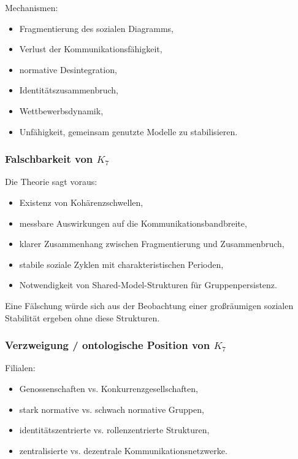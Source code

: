 Mechanismen:
\begin{itemize}
    \item Fragmentierung des sozialen Diagramms,
    \item Verlust der Kommunikationsfähigkeit,
    \item normative Desintegration,
    \item Identitätszusammenbruch,
    \item Wettbewerbsdynamik,
    \item Unfähigkeit, gemeinsam genutzte Modelle zu stabilisieren.
\end{itemize}

\subsubsection{Falschbarkeit von \texorpdfstring{$K_7$}{K_7}}

Die Theorie sagt voraus:
\begin{itemize}
    \item Existenz von Kohärenzschwellen,
    \item messbare Auswirkungen auf die Kommunikationsbandbreite,
    \item klarer Zusammenhang zwischen Fragmentierung und Zusammenbruch,
    \item stabile soziale Zyklen mit charakteristischen Perioden,
    \item Notwendigkeit von Shared-Model-Strukturen für Gruppenpersistenz.
\end{itemize}

Eine Fälschung würde sich aus der Beobachtung einer großräumigen sozialen Stabilität ergeben
ohne diese Strukturen.

\subsubsection{Verzweigung / ontologische Position von \texorpdfstring{$K_7$}{K_7}}

Filialen:
\begin{itemize}
    \item Genossenschaften vs. Konkurrenzgesellschaften,
    \item stark normative vs. schwach normative Gruppen,
    \item identitätszentrierte vs. rollenzentrierte Strukturen,
    \item zentralisierte vs. dezentrale Kommunikationsnetzwerke.
\end{itemize}

